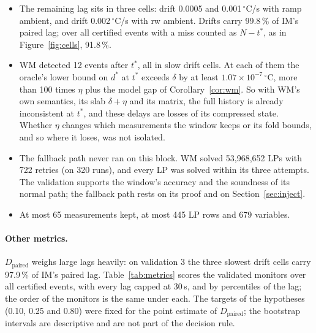 \documentclass[11pt,a4paper]{article}
\newcommand{\degC}{\ensuremath{{}^\circ}C}
\newcommand{\sci}[2]{\ensuremath{#1\times10^{#2}}}
\newcommand{\Dp}{D_{\mathrm{paired}}}
\newcommand{\tstar}{t^{\ast}}
\begin{document}
\begin{itemize}
  consistent under the exact model.
\item The remaining lag sits in three cells: drift 0.0005 and 0.001\,\degC/s with ramp ambient, and drift
  0.002\,\degC/s with rw ambient. Drifts carry 99.8\,\% of IM's paired lag; over all certified events with
  a miss counted as $N-\tstar$, as in Figure~\ref{fig:cells}, 91.8\,\%.
\item WM detected 12 events after $\tstar$, all in slow drift cells. At each of them the oracle's lower bound on $d^\ast$
  at $\tstar$ exceeds $\delta$ by at least \sci{1.07}{-7}\,\degC, more than 100 times $\eta$ plus the model gap of
  Corollary~\ref{cor:wm}. So with WM's own semantics, its slab $\delta+\eta$ and its matrix, the full history is
  already inconsistent at $\tstar$, and these delays are losses of its compressed state. Whether $\eta$ changes which
  measurements the window keeps or its fold bounds, and so where it loses, was not isolated.
\item The fallback path never ran on this block. WM solved 53,968,652 LPs with 722 retries (on 320 runs), and every LP was solved
  within its three attempts. The validation supports the window's accuracy and the soundness of its normal path; the
  fallback path rests on its proof and on Section~\ref{sec:inject}.
\item At most 65 measurements kept, at most 445 LP rows and 679 variables.
\end{itemize}

\paragraph{Other metrics.} $\Dp$ weighs large lags heavily: on validation 3 the three slowest drift cells carry
97.9\,\% of IM's paired lag. Table~\ref{tab:metrics} scores the validated monitors over all certified events, with
every lag capped at 30\,s, and by percentiles of the lag; the order of the monitors is the same under each. The
targets of the hypotheses (0.10, 0.25 and 0.80) were fixed for the point estimate of $\Dp$; the bootstrap intervals are
descriptive and are not part of the decision rule.
\end{document}
